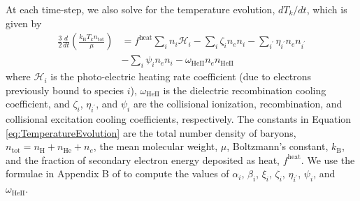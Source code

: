 \documentclass[letterpaper,titlepage,12pt]{article}
\numberwithin{equation}{section}
\newcommand{\HeII}{\text{HeII}}
\newcommand{\nHeII}{n_{\text{HeII}}}
\newcommand{\ntot}{n_{\text{tot}}}
\newcommand{\kB}{k_{\text{B}}}
\newcommand{\fheat}{f^{\text{heat}}}
\newcommand{\Heat}{\mathcal{H}}
\begin{document}
At each time-step, we also solve for the temperature evolution, $dT_k/dt$,
which
is given by
\begin{align}
    \frac{3}{2}\frac{d}{dt}\left(\frac{\kB T_k \ntot}{\mu}\right) & = \fheat  \sum_i n_i \Heat_i - \sum_i \zeta_i n_e n_i - \sum_{i^{\prime}} \eta_{i^{\prime}} n_e n_{i^{\prime}} \nonumber \\ & - \sum_i \psi_i n_e n_i - \omega_{\HeII} n_e \nHeII \label{eq:TemperatureEvolution} 
\end{align}
where $\Heat_i$ is the photo-electric heating rate coefficient (due to
electrons previously bound to species $i$), $\omega_{\HeII}$ is the dielectric
recombination cooling coefficient, and $\zeta_i$, $\eta_{i^{\prime}}$, and
$\psi_i$ are the collisional ionization, recombination, and collisional
excitation cooling coefficients, respectively. The constants in Equation
\ref{eq:TemperatureEvolution} are the total number density of baryons, $\ntot
= n_\mathrm{H} + n_{\mathrm{He}} + n_e$, the mean molecular weight, $\mu$,
Boltzmann's constant, $\kB$, and the fraction of secondary electron energy
deposited as heat, $\fheat$. We use the formulae in Appendix B of
\citet{Fukugita1994} to compute the values of $\alpha_i$, $\beta_i$, $\xi_i$,
$\zeta_i$, $\eta_{i^{\prime}}$, $\psi_i$, and $\omega_{\HeII}$.


\end{document}
